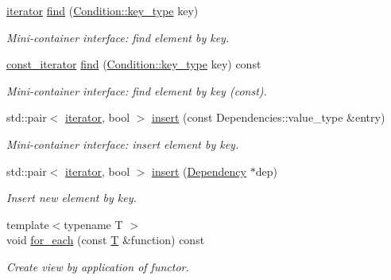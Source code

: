 \begin{DoxyCompactItemize}
\hyperlink{class_d_d4hep_1_1_conditions_1_1_conditions_dependency_collection_a685a1a6841f2fa4d70ab9a9bfb7b0b6a}{iterator} \hyperlink{class_d_d4hep_1_1_conditions_1_1_conditions_dependency_collection_aa1ab8e6418ce818e247ac52baf25bf5e}{find} (\hyperlink{class_d_d4hep_1_1_conditions_1_1_condition_a7528efa762e8cc072ef80ea67c3531f9}{Condition::key\_\-type} key)
\begin{DoxyCompactList}\small\item\em Mini-\/container interface: find element by key. \item\end{DoxyCompactList}\item 
\hyperlink{class_d_d4hep_1_1_conditions_1_1_conditions_dependency_collection_ab5e9bcdc3330c3b694303f627799dc84}{const\_\-iterator} \hyperlink{class_d_d4hep_1_1_conditions_1_1_conditions_dependency_collection_a88c83a2c527d746502b8c0bf79142e8f}{find} (\hyperlink{class_d_d4hep_1_1_conditions_1_1_condition_a7528efa762e8cc072ef80ea67c3531f9}{Condition::key\_\-type} key) const 
\begin{DoxyCompactList}\small\item\em Mini-\/container interface: find element by key (const). \item\end{DoxyCompactList}\item 
std::pair$<$ \hyperlink{class_d_d4hep_1_1_conditions_1_1_conditions_dependency_collection_a685a1a6841f2fa4d70ab9a9bfb7b0b6a}{iterator}, bool $>$ \hyperlink{class_d_d4hep_1_1_conditions_1_1_conditions_dependency_collection_a2135e9b1eb88d36301f88d9ef33a11a8}{insert} (const Dependencies::value\_\-type \&entry)
\begin{DoxyCompactList}\small\item\em Mini-\/container interface: insert element by key. \item\end{DoxyCompactList}\item 
std::pair$<$ \hyperlink{class_d_d4hep_1_1_conditions_1_1_conditions_dependency_collection_a685a1a6841f2fa4d70ab9a9bfb7b0b6a}{iterator}, bool $>$ \hyperlink{class_d_d4hep_1_1_conditions_1_1_conditions_dependency_collection_a2f8d2a2f72821fbf0c223f24b9b074af}{insert} (\hyperlink{class_d_d4hep_1_1_conditions_1_1_condition_dependency}{Dependency} $\ast$dep)
\begin{DoxyCompactList}\small\item\em Insert new element by key. \item\end{DoxyCompactList}\item 
{\footnotesize template$<$typename T $>$ }\\void \hyperlink{class_d_d4hep_1_1_conditions_1_1_conditions_dependency_collection_a3836e72b17bbaab6559f4f633e185ddd}{for\_\-each} (const \hyperlink{class_t}{T} \&function) const 
\begin{DoxyCompactList}\small\item\em Create view by application of functor. \item\end{DoxyCompactList}\end{DoxyCompactItemize}
